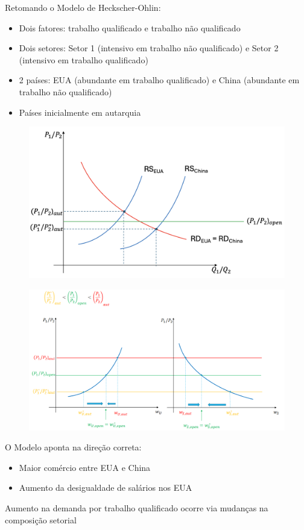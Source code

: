 \documentclass[a4paper,12pt]{article}[abntex2]
\begin{document}
Retomando o Modelo de Heckscher-Ohlin:
\begin{itemize}
    \item Dois fatores: trabalho qualificado e trabalho não qualificado
    \item Dois setores: Setor 1 (intensivo em trabalho não qualificado) e Setor 2 (intensivo em trabalho qualificado)
    \item 2 países: EUA (abundante em trabalho qualificado) e China (abundante em trabalho não qualificado)
    \item Países inicialmente em autarquia
\end{itemize}

\begin{figure}[H]
    \centering
    \includegraphics[width=0.7\linewidth]{Imagens/a13i9.png}
\end{figure}

\begin{figure}[H]
    \centering
    \includegraphics[width=0.7\linewidth]{Imagens/a13i10.png}
\end{figure}

O Modelo aponta na direção correta:
\begin{itemize}
    \item Maior comércio entre EUA e China
    \item Aumento da desigualdade de salários nos EUA
\end{itemize}

Aumento na demanda por trabalho qualificado ocorre via mudanças na composição setorial
\end{document}
